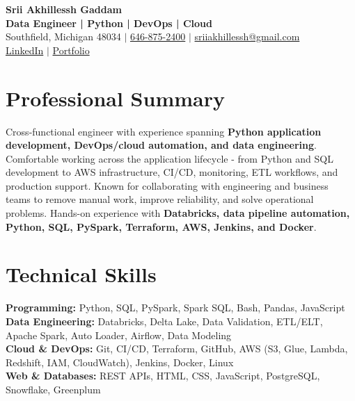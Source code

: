 \documentclass[letterpaper,10pt]{article}
\begin{document}
\fontsize{9.35pt}{10.45pt}\selectfont

\begin{center}
    {\LARGE \textbf{Srii Akhillessh Gaddam}} \\[-1pt]
    \textbf{Data Engineer | Python | DevOps | Cloud} \\[2pt]
    Southfield, Michigan 48034 $|$
    \href{tel:6468752400}{646-875-2400} $|$
    \href{mailto:sriiakhillessh@gmail.com}{sriiakhillessh@gmail.com} \\[1pt]
    \href{https://www.linkedin.com/in/srii-akhiilessh-gaddam-b48668191/}{LinkedIn} $|$
    \href{https://sriiakhillesshg.github.io/portfolio/}{Portfolio}
\end{center}
\vspace{-8pt}

\section{Professional Summary}
\small{Cross-functional engineer with experience spanning \textbf{Python application development, DevOps/cloud automation, and data engineering}. Comfortable working across the application lifecycle - from Python and SQL development to AWS infrastructure, CI/CD, monitoring, ETL workflows, and production support. Known for collaborating with engineering and business teams to remove manual work, improve reliability, and solve operational problems. Hands-on experience with \textbf{Databricks, data pipeline automation, Python, SQL, PySpark, Terraform, AWS, Jenkins, and Docker}.}

\section{Technical Skills}
\small{
\textbf{Programming:} Python, SQL, PySpark, Spark SQL, Bash, Pandas, JavaScript \\
\textbf{Data Engineering:} Databricks, Delta Lake, Data Validation, ETL/ELT, Apache Spark, Auto Loader, Airflow, Data Modeling \\
\textbf{Cloud \& DevOps:} Git, CI/CD, Terraform, GitHub, AWS (S3, Glue, Lambda, Redshift, IAM, CloudWatch), Jenkins, Docker, Linux \\
\textbf{Web \& Databases:} REST APIs, HTML, CSS, JavaScript, PostgreSQL, Snowflake, Greenplum
}

\end{document}
